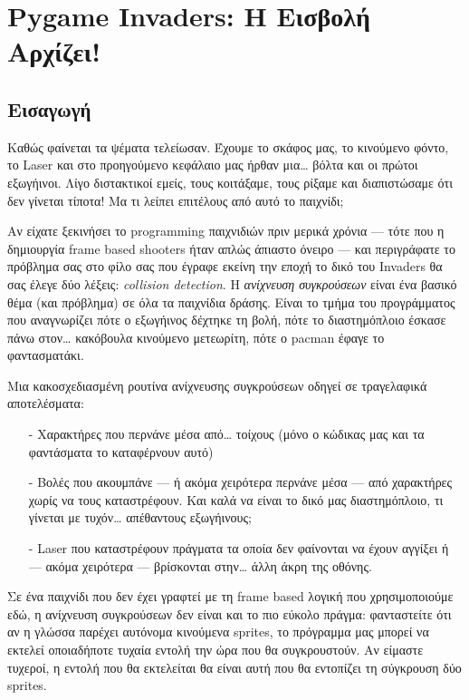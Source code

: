 \chapter{Pygame Invaders: Η Εισβολή Αρχίζει!}
\label{chap:pygame-invaders-invasion}
\section{Εισαγωγή}
Καθώς φαίνεται τα ψέματα τελείωσαν. Έχουμε το σκάφος μας, το κινούμενο φόντο, το Laser και στο προηγούμενο κεφάλαιο μας ήρθαν μια\ldots{} βόλτα και οι πρώτοι εξωγήινοι.  Λίγο διστακτικοί εμείς, τους κοιτάξαμε, τους ρίξαμε και διαπιστώσαμε ότι δεν γίνεται τίποτα! Μα τι λείπει επιτέλους από αυτό το παιχνίδι;

Αν είχατε ξεκινήσει το programming παιχνιδιών πριν μερικά χρόνια --- τότε που η δημιουργία frame based shooters ήταν απλώς άπιαστο όνειρο --- και περιγράφατε το πρόβλημα σας στο φίλο σας που έγραφε εκείνη την εποχή το δικό του Invaders θα σας έλεγε δύο λέξεις: \emph{collision detection}. Η \emph{ανίχνευση συγκρούσεων} είναι ένα βασικό θέμα (και πρόβλημα) σε όλα τα παιχνίδια δράσης. Είναι το τμήμα του προγράμματος που αναγνωρίζει πότε ο εξωγήινος δέχτηκε τη βολή, πότε το διαστημόπλοιο έσκασε πάνω στον\ldots{} κακόβουλα κινούμενο μετεωρίτη, πότε ο pacman έφαγε το φαντασματάκι.

Μια κακοσχεδιασμένη ρουτίνα ανίχνευσης συγκρούσεων οδηγεί σε τραγελαφικά αποτελέσματα:
%
\begin{itemize}
\item[-] Χαρακτήρες που περνάνε μέσα από\ldots{} τοίχους (μόνο ο κώδικας μας και τα φαντάσματα το καταφέρνουν αυτό)
\item[-] Βολές που ακουμπάνε --- ή ακόμα χειρότερα περνάνε μέσα --- από χαρακτήρες χωρίς να τους καταστρέφουν. Και καλά να είναι το δικό μας διαστημόπλοιο, τι γίνεται με τυχόν\ldots{} απέθαντους εξωγήινους;
\item[-] Laser που καταστρέφουν πράγματα τα οποία δεν φαίνονται να έχουν αγγίξει ή --- ακόμα χειρότερα --- βρίσκονται στην\ldots{} άλλη άκρη της οθόνης.
\end{itemize}

Σε ένα παιχνίδι που δεν έχει γραφτεί με τη frame based λογική που χρησιμοποιούμε εδώ, η ανίχνευση συγκρούσεων δεν είναι και το πιο εύκολο πράγμα: φανταστείτε ότι αν η γλώσσα  παρέχει αυτόνομα κινούμενα sprites, το πρόγραμμα μας μπορεί να εκτελεί οποιαδήποτε τυχαία εντολή την ώρα που θα συγκρουστούν. Αν είμαστε τυχεροί, η εντολή που θα εκτελείται θα είναι αυτή που θα εντοπίζει τη σύγκρουση δύο sprites.

